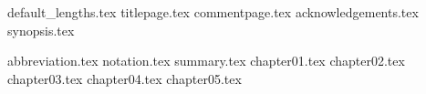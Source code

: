 \documentclass{report}
\begin{document}
	{default_lengths.tex}
	{titlepage.tex}
	{commentpage.tex}
	{acknowledgements.tex}
	{synopsis.tex}
	\tableofcontents %
	\newpage{}
	\listoffigures %
	\listoftables %
	\newpage
	{abbreviation.tex}
	{notation.tex}
	{summary.tex}
	{chapter01.tex}
	{chapter02.tex}
	{chapter03.tex}
	{chapter04.tex}
	{chapter05.tex}
	\printbibliography
	
	
\end{document}
